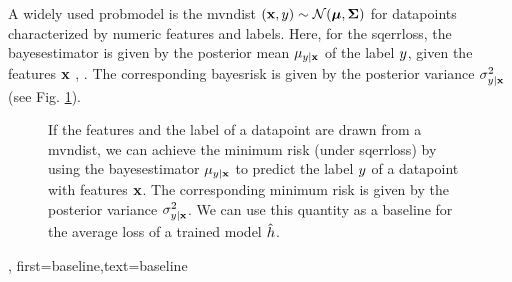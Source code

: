 {{A widely used \gls{probmodel} is the \gls{mvndist} $\left( {\bf x},y \right) \sim \mathcal{N}({\bm \mu},{\bm \Sigma})$ 
for \gls{datapoint}s characterized by numeric \gls{feature}s and \gls{label}s.
Here, for the \gls{sqerrloss}, the \gls{bayesestimator} is given by the posterior 
\gls{mean} $\mu_{y|{\bf x}}$ of the \gls{label} $y$, given the 
\gls{feature}s ${\bf x}$ \cite{LC}, \cite{GrayProbBook}. The corresponding \gls{bayesrisk} 
is given by the posterior \gls{variance} 
$\sigma^{2}_{y|{\bf x}}$ (see Fig. \ref{fig_post_baseline_dict}).
	\begin{figure}[H]
		\begin{center}
		\end{center}
		\caption{If the \gls{feature}s and the \gls{label} of a \gls{datapoint} are drawn from a \gls{mvndist}, we 
		can achieve the \gls{minimum} \gls{risk} (under \gls{sqerrloss}) by using the \gls{bayesestimator} $\mu_{y|{\bf x}}$ 
		to predict the \gls{label} $y$ of a \gls{datapoint} with \gls{feature}s ${\bf x}$. The corresponding 
		\gls{minimum} \gls{risk} is given by the posterior \gls{variance} $\sigma^{2}_{y|{\bf x}}$. We can use 
		this quantity as a baseline for the average \gls{loss} of a trained \gls{model} $\hat{h}$. \label{fig_post_baseline_dict}}
	\end{figure}},
    first={baseline},text={baseline}
}

